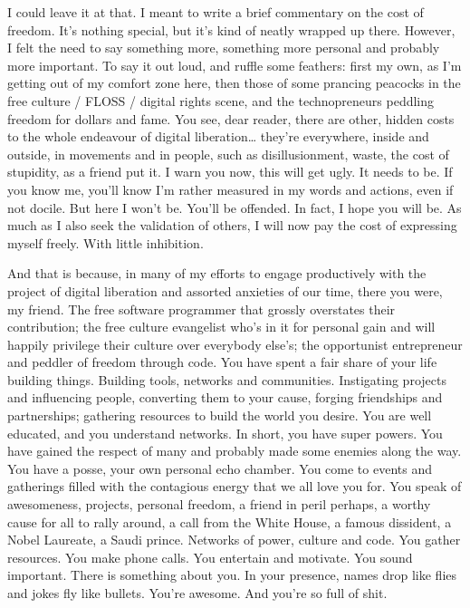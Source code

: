 I could leave it at that. I meant to write a brief commentary on the
cost of freedom. It's nothing special, but it's kind of neatly wrapped
up there. However, I felt the need to say something more, something more
personal and probably more important. To say it out loud, and ruffle
some feathers: first my own, as I'm getting out of my comfort zone here,
then those of some prancing peacocks in the free culture / FLOSS /
digital rights scene, and the technopreneurs peddling freedom for
dollars and fame. You see, dear reader, there are other, hidden costs to
the whole endeavour of digital liberation\ldots{} they're everywhere,
inside and outside, in movements and in people, such as disillusionment,
waste, the cost of stupidity, as a friend put it. I warn you now, this
will get ugly. It needs to be. If you know me, you'll know I'm rather
measured in my words and actions, even if not docile. But here I won't
be. You'll be offended. In fact, I hope you will be. As much as I also
seek the validation of others, I will now pay the cost of expressing
myself freely. With little inhibition.

And that is because, in many of my efforts to engage productively with
the project of digital liberation and assorted anxieties of our time,
there you were, my friend. The free software programmer that grossly
overstates their contribution; the free culture evangelist who's in it
for personal gain and will happily privilege their culture over
everybody else's; the opportunist entrepreneur and peddler of freedom
through code. You have spent a fair share of your life building things.
Building tools, networks and communities. Instigating projects and
influencing people, converting them to your cause, forging friendships
and partnerships; gathering resources to build the world you desire. You
are well educated, and you understand networks. In short, you have super
powers. You have gained the respect of many and probably made some
enemies along the way. You have a posse, your own personal echo chamber.
You come to events and gatherings filled with the contagious energy that
we all love you for. You speak of awesomeness, projects, personal
freedom, a friend in peril perhaps, a worthy cause for all to rally
around, a call from the White House, a famous dissident, a Nobel
Laureate, a Saudi prince. Networks of power, culture and code. You
gather resources. You make phone calls. You entertain and motivate. You
sound important. There is something about you. In your presence, names
drop like flies and jokes fly like bullets. You're awesome. And you're
so full of shit.

